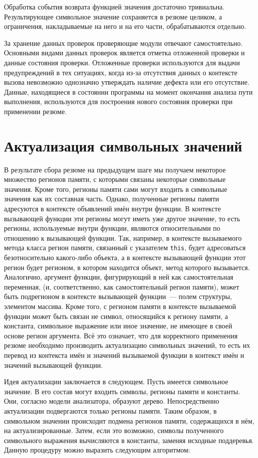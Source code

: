 Обработка события возврата функцией значения достаточно тривиальна. Результирующее символьное значение сохраняется в резюме целиком, а ограничения, накладываемые на него и на его части, обрабатываются отдельно.

За хранение данных проверок проверяющие модули отвечают самостоятельно. Основными видами данных проверок является отметка отложенной проверки и данные состояния проверки. Отложенные проверки используются для выдачи предупреждений в тех ситуациях, когда из-за отсутствия данных о контексте вызова невозможно однозначно утверждать наличие дефекта или его отсутствие. Данные, находящиеся в состоянии программы на момент окончания анализа пути выполнения, используются для построения нового состояния проверки при применении резюме. 

\section{Актуализация символьных значений}

В результате сбора резюме на предыдущем шаге мы получаем некоторое множество регионов памяти, с которыми связаны некоторые символьные значения. Кроме того, регионы памяти сами могут входить в символьные значения как их составная часть. Однако, полученные регионы памяти адресуются в контексте объявлений имён внутри функции. В контексте вызывающей функции эти регионы могут иметь уже другое значение, то есть регионы, используемые внутри функции, являются относительными по отношению к вызывающей функции. Так, например, в контексте вызываемого метода класса регион памяти, связанный с указателем \texttt{this}, будет адресоваться безотносительно какого-либо объекта, а в контексте вызывающей функции этот регион будет регионом, в котором находится объект, метод которого вызывается. Аналогично, аргумент функции, фигурирующий в ней как самостоятельная переменная, (и, соответственно, как самостоятельный регион памяти), может быть подрегионом в контексте вызывающей функции~--- полем структуры, элементом массива. Кроме того, с регионом памяти в контексте вызываемой функции может быть связан не символ, относящийся к региону памяти, а константа, символьное выражение или иное значение, не имеющее в своей основе регион аргумента. Всё это означает, что для корректного применения резюме необходимо производить актуализацию символьных значений, то есть их перевод из контекста имён и значений вызываемой функции в контекст имён и значений вызывающей функции.

Идея актуализации заключается в следующем. Пусть имеется символьное значение. В его состав могут входить символы, регионы памяти и константы. Они, согласно модели анализатора, образуют дерево. Непосредственно актуализации подвергаются только регионы памяти. Таким образом, в символьном значении происходит подмена регионов памяти, содержащихся в нём, на актуализированные. Затем, если это возможно, символы полученного символьного выражения вычисляются в константы, заменяя исходные поддеревья. Данную процедуру можно выразить следующим алгоритмом:

